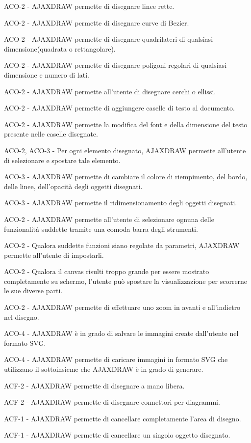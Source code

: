 \begin{elenconumerato}{\subsubsecindent}
\item{ACO-2 - AJAXDRAW permette di disegnare linee rette.}
\item{ACO-2 - AJAXDRAW permette di disegnare curve di Bezier.}
\item{ACO-2 - AJAXDRAW permette di disegnare quadrilateri di qualsiasi dimensione(quadrata o rettangolare).}
\item{ACO-2 - AJAXDRAW permette di disegnare poligoni regolari di qualsiasi dimensione e numero di lati.}
\item{ACO-2 - AJAXDRAW permette all'utente di disegnare cerchi o ellissi.}
\item{ACO-2 - AJAXDRAW permette di aggiungere caselle di testo al documento. }
\item{ACO-2 - AJAXDRAW permette la modifica del font e della dimensione del testo presente nelle caselle disegnate.}
\item{ACO-2, ACO-3 - Per ogni elemento disegnato, AJAXDRAW permette all'utente di selezionare e spostare tale elemento.}
\item{ACO-3 - AJAXDRAW permette di cambiare il colore di riempimento, del bordo, delle linee, dell'opacit\`a degli oggetti disegnati.}
\item{ACO-3 - AJAXDRAW permette il ridimensionamento degli oggetti disegnati.}
\item{ACO-2 - AJAXDRAW permette all'utente di selezionare ognuna delle funzionalit\`a suddette tramite una comoda barra degli strumenti.}
\item{ACO-2 - Qualora suddette funzioni siano regolate da parametri, AJAXDRAW permette all'utente di impostarli.}
\item {ACO-2 - Qualora il canvas risulti troppo grande per essere mostrato completamente su schermo, l'utente pu\`o spostare la visualizzazione per scorrerne le sue diverse parti.}
\item{ACO-2 - AJAXDRAW permette di effettuare uno zoom in avanti e all'indietro nel disegno.}
\item{ACO-4 - AJAXDRAW \`e in grado di salvare le immagini create dall'utente nel formato SVG.}
\item{ACO-4 - AJAXDRAW permette di caricare immagini in formato SVG che utilizzano il sottoinsieme che AJAXDRAW \`e in grado di generare.}
\end{elenconumerato}

\begin{elenconumerato}{\subsubsecindent}
\item{ACF-2 - AJAXDRAW permette di disegnare a mano libera.}
\item{ACF-2 - AJAXDRAW permette di disegnare connettori per diagrammi.}
\item{ACF-1 - AJAXDRAW permette di cancellare completamente l'area di disegno.}
\item{ACF-1 - AJAXDRAW permette di cancellare un singolo oggetto disegnato.}
\end{elenconumerato}

